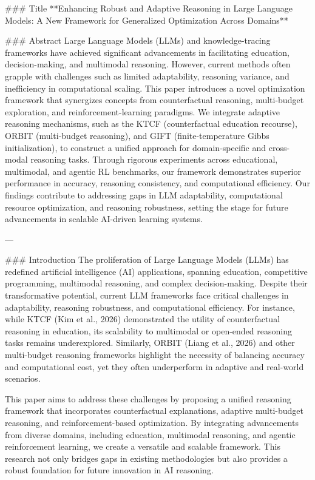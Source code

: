 ### Title
**Enhancing Robust and Adaptive Reasoning in Large Language Models: A New Framework for Generalized Optimization Across Domains**

### Abstract
Large Language Models (LLMs) and knowledge-tracing frameworks have achieved significant advancements in facilitating education, decision-making, and multimodal reasoning. However, current methods often grapple with challenges such as limited adaptability, reasoning variance, and inefficiency in computational scaling. This paper introduces a novel optimization framework that synergizes concepts from counterfactual reasoning, multi-budget exploration, and reinforcement-learning paradigms. We integrate adaptive reasoning mechanisms, such as the KTCF (counterfactual education recourse), ORBIT (multi-budget reasoning), and GIFT (finite-temperature Gibbs initialization), to construct a unified approach for domain-specific and cross-modal reasoning tasks. Through rigorous experiments across educational, multimodal, and agentic RL benchmarks, our framework demonstrates superior performance in accuracy, reasoning consistency, and computational efficiency. Our findings contribute to addressing gaps in LLM adaptability, computational resource optimization, and reasoning robustness, setting the stage for future advancements in scalable AI-driven learning systems.

---

### Introduction
The proliferation of Large Language Models (LLMs) has redefined artificial intelligence (AI) applications, spanning education, competitive programming, multimodal reasoning, and complex decision-making. Despite their transformative potential, current LLM frameworks face critical challenges in adaptability, reasoning robustness, and computational efficiency. For instance, while KTCF (Kim et al., 2026) demonstrated the utility of counterfactual reasoning in education, its scalability to multimodal or open-ended reasoning tasks remains underexplored. Similarly, ORBIT (Liang et al., 2026) and other multi-budget reasoning frameworks highlight the necessity of balancing accuracy and computational cost, yet they often underperform in adaptive and real-world scenarios.

This paper aims to address these challenges by proposing a unified reasoning framework that incorporates counterfactual explanations, adaptive multi-budget reasoning, and reinforcement-based optimization. By integrating advancements from diverse domains, including education, multimodal reasoning, and agentic reinforcement learning, we create a versatile and scalable framework. This research not only bridges gaps in existing methodologies but also provides a robust foundation for future innovation in AI reasoning.

